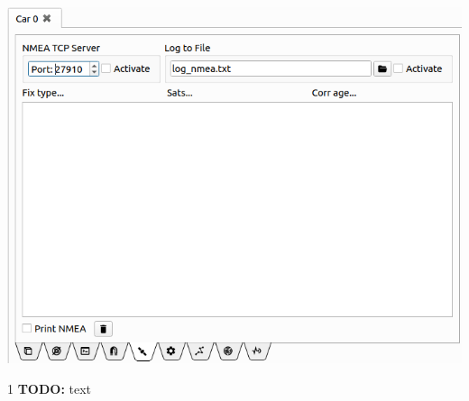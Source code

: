 \documentclass[12pt]{article} %
\def\printtodos{0}
\newcommand{\todo}[1]{
  \if\printtodos1
      {\color{red} \textbf{TODO:} #1}
  \fi}
\begin{document}
\noindent\begin{minipage}{0.5\textwidth}
  \noindent \includegraphics[width=\textwidth]{./screens/Car_GPS.png}
\end{minipage}
\begin{minipage}{0.5\textwidth} %
  \todo{text}
\end{minipage}
\end{document}
